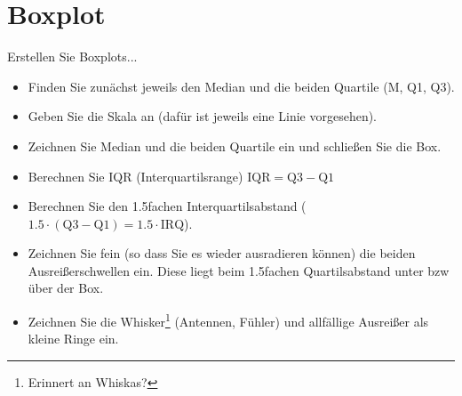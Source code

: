 

\renewcommand{\metaHeaderLine}{Arbeitsblatt}
\renewcommand{\arbeitsblattTitel}{Boxplot}


\usepackage{cancel}

\newcommand\Ccancel[2][black]{\renewcommand\CancelColor{\color{#1}}\cancel{#2}}


\arbeitsblattHeader{}
\section{Boxplot}
Erstellen Sie Boxplots...


\begin{itemize}
\item Finden Sie zunächst jeweils den Median und die beiden Quartile
(M, Q1, Q3).
\item Geben Sie die Skala an (dafür ist jeweils eine Linie
vorgesehen).
\item Zeichnen Sie Median und die beiden Quartile ein und schließen
Sie die Box.
\item Berechnen Sie IQR (Interquartilsrange) $\textrm{IQR} = \textrm{Q3} - \textrm{Q1}$
\item Berechnen Sie den 1.5fachen Interquartilsabstand
($1.5\cdot{}(\textrm{Q3}-\textrm{Q1}) = 1.5 \cdot \textrm{IRQ}$).
\item Zeichnen Sie fein (so dass Sie es wieder ausradieren können) die beiden
Ausreißerschwellen ein. Diese liegt beim 1.5fachen Quartilsabstand
unter bzw über der Box.
\item Zeichnen Sie die Whisker\footnote{Erinnert an Whiskas?}
(Antennen, Fühler) und  allfällige Ausreißer als kleine Ringe ein.
\end{itemize}

\newcommand{\boxplot}[2]{
\subsection{Daten}
\begin{tabular}{#1}
\hline
#2\\
\hline
\end{tabular}

\subsubsection*{Boxplot}
\noTRAINER{\mmPapier{1.6}}
}%


